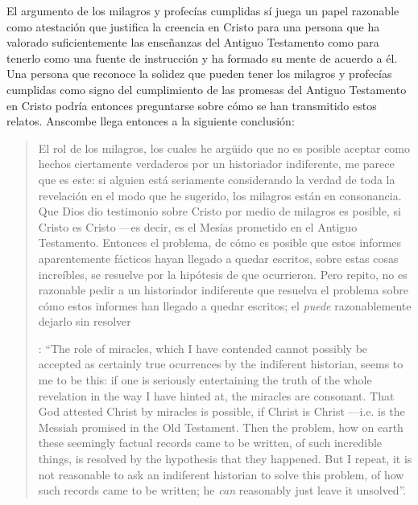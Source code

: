 El argumento de los milagros y profecías cumplidas sí juega un papel razonable como atestación que justifica la creencia en Cristo para una persona que ha valorado suficientemente las enseñanzas del Antiguo Testamento como para tenerlo como una fuente de instrucción y ha formado su mente de acuerdo a él. Una persona que reconoce la solidez que pueden tener los milagros y profecías cumplidas como signo del cumplimiento de las promesas del Antiguo Testamento en Cristo podría entonces preguntarse sobre cómo se han transmitido estos relatos. Anscombe llega entonces a la siguiente conclusión: \blockquote[{\Cite[37]{anscombe2008faith:prophandmi}}: \enquote{The role of miracles, which I have contended cannot possibly be accepted as certainly true ocurrences by the indiferent historian, seems to me to be this: if one is seriously entertaining the truth of the whole revelation in the way I have hinted at, the miracles are consonant. That God attested Christ by miracles is possible, if Christ is Christ ---i.e. is the Messiah promised in the Old Testament. Then the problem, how on earth these seemingly factual records came to be written, of such incredible things, is resolved by the hypothesis that they happened. \textelp{} But I repeat, it is not reasonable to ask an indiferent historian to solve this problem, of how such records came to be written; he \emph{can} reasonably just leave it unsolved}.]{El rol de los milagros, los cuales he argüido que no es posible aceptar como hechos ciertamente verdaderos por un historiador indiferente, me parece que es este: si alguien está seriamente considerando la verdad de toda la revelación en el modo que he sugerido, los milagros están en consonancia. Que Dios dio testimonio sobre Cristo por medio de milagros es posible, si Cristo es Cristo ---es decir, es el Mesías prometido en el Antiguo Testamento. Entonces el problema, de cómo es posible que estos informes aparentemente fácticos hayan llegado a quedar escritos, sobre estas cosas increíbles, se resuelve por la hipótesis de que ocurrieron. \textelp{} Pero repito, no es razonable pedir a un historiador indiferente que resuelva el problema sobre cómo estos informes han llegado a quedar escritos; el \emph{puede} razonablemente dejarlo sin resolver}.

